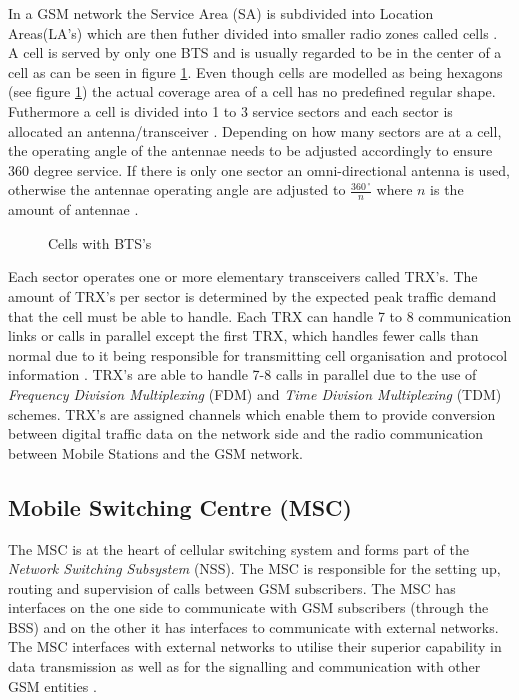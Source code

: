In a GSM network the Service Area (SA) is subdivided into Location Areas(LA's) which are then futher divided into smaller radio zones called cells \cite{GSMSecurInTeleNetwork}. A cell is served by only one BTS and is usually regarded to be in the center of a cell as can be seen in figure \ref{fig:GSMCell}. Even though cells are modelled as being hexagons (see figure \ref{fig:GSMCell}) the actual coverage area of a cell has no predefined regular shape. Futhermore a cell is divided into 1 to 3 service sectors and each sector is allocated an antenna/transceiver \cite{GSMSysEngin}. Depending on how many sectors are at a cell, the operating angle of the antennae needs to be adjusted accordingly to ensure 360 degree service. If there is only one sector an omni-directional antenna is used, otherwise the antennae operating angle are adjusted to $\frac{360\,^{\circ}}{n}$ where ${n}$ is the amount of antennae \cite{Eisenblatter}.
\begin{figure}[h]
	\begin{centering}
		
		\caption{Cells with BTS's}
		\label{fig:GSMCell}
	\end{centering}
\end{figure}


Each sector operates one or more elementary transceivers called TRX’s. The amount of TRX’s per sector is determined by the expected peak traffic demand that the cell must be able to handle. Each TRX can handle 7 to 8 communication links or calls in parallel except the first TRX, which handles fewer calls than normal due to it being responsible for transmitting cell organisation and protocol information \cite{Eisenblatter}. TRX’s are able to handle 7-8 calls in parallel due to the use of \emph{Frequency Division Multiplexing} (FDM) and \emph{Time Division Multiplexing} (TDM) schemes. TRX’s are assigned channels which enable them to provide conversion between digital traffic data on the network side and the radio communication between Mobile Stations and 
the GSM network. \cite{ACOvsEA,FAPOrientationModel}

\subsection{Mobile Switching Centre (MSC)}

The MSC is at the heart of cellular switching system and forms part of the \emph{Network Switching Subsystem} (NSS). The MSC is responsible for the setting up, routing and supervision of calls between GSM subscribers. The MSC has interfaces on the one side to communicate with GSM subscribers (through the BSS) and on the other it has interfaces to communicate with external networks. The MSC interfaces with external networks to utilise their superior capability in data transmission as well as for the signalling and communication with other GSM entities \cite{GSM92}. 

